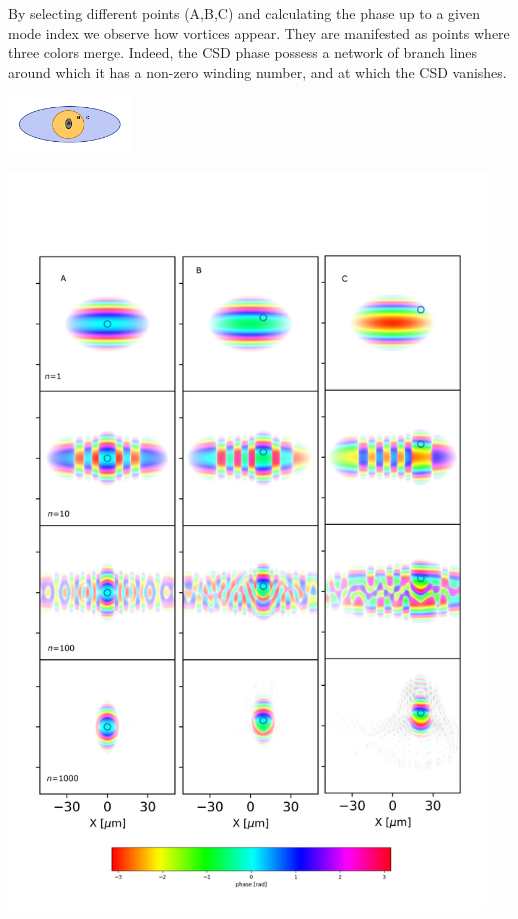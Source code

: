 \documentclass[a4paper,10pt]{article}
\begin{document}
By selecting different points (A,B,C) and calculating the phase up to a given mode index we observe how vortices appear. They are manifested as points where three colors merge.  Indeed, the CSD phase possess a network of branch lines around which it has a non-zero winding number, and at which the CSD vanishes.

\begin{center}
\includegraphics[width=0.25\textwidth]{Figures/eye}

\includegraphics[width=0.95\textwidth]{Figures/vx_id16a_ABC.png}
\end{center}
 
\end{document}

